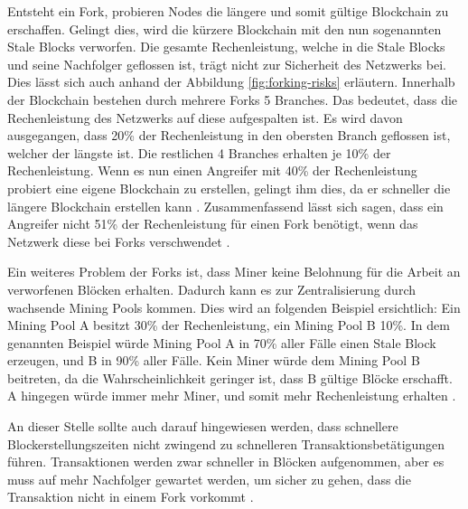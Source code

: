 Entsteht ein Fork, probieren Nodes die längere und somit gültige Blockchain zu erschaffen. Gelingt dies, wird die kürzere Blockchain mit den nun sogenannten Stale Blocks verworfen. Die gesamte Rechenleistung, welche in die Stale Blocks und seine Nachfolger geflossen ist, trägt nicht zur Sicherheit des Netzwerks bei. Dies lässt sich auch anhand der Abbildung \ref{fig:forking-risks} erläutern. Innerhalb der Blockchain bestehen durch mehrere Forks 5 Branches. Das bedeutet, dass die Rechenleistung des Netzwerks auf diese aufgespalten ist. Es wird davon ausgegangen, dass 20\% der Rechenleistung in den obersten Branch geflossen ist, welcher der längste ist. Die restlichen 4 Branches erhalten je 10\% der Rechenleistung. Wenn es nun einen Angreifer mit 40\% der Rechenleistung probiert eine eigene Blockchain zu erstellen, gelingt ihm dies, da er schneller die längere Blockchain erstellen kann \cite{SompolinskyAcceleratingBitcoinTransaction2013}. Zusammenfassend lässt sich sagen, dass ein Angreifer nicht 51\% der Rechenleistung für einen Fork benötigt, wenn das Netzwerk diese bei Forks verschwendet \cite{Buterin12secondBlockTime2014}. 

Ein weiteres Problem der Forks ist, dass Miner keine Belohnung für die Arbeit an verworfenen Blöcken erhalten. Dadurch kann es zur Zentralisierung durch wachsende Mining Pools kommen. Dies wird an folgenden Beispiel ersichtlich: Ein Mining Pool A besitzt 30\% der Rechenleistung, ein Mining Pool B 10\%. In dem genannten Beispiel würde Mining Pool A in 70\% aller Fälle einen Stale Block erzeugen, und B in 90\% aller Fälle. Kein Miner würde dem Mining Pool B beitreten, da die Wahrscheinlichkeit geringer ist, dass B gültige Blöcke erschafft. A hingegen würde immer mehr Miner, und somit mehr Rechenleistung erhalten \cite{EthereumTeamEthereumWhitePaper2017}.


An dieser Stelle sollte auch darauf hingewiesen werden, dass schnellere Blockerstellungszeiten nicht zwingend zu schnelleren Transaktionsbetätigungen führen. Transaktionen werden zwar schneller in Blöcken aufgenommen, aber es muss auf mehr Nachfolger gewartet werden, um sicher zu gehen, dass die Transaktion nicht in einem Fork vorkommt \cite{SchererPerformanceScalabilityBlockchain2017}.

